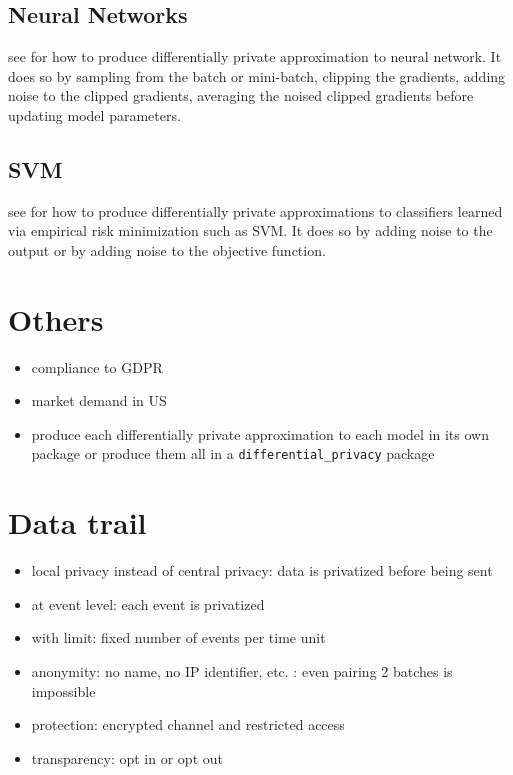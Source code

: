 \documentclass[12pt]{amsart}
\theoremstyle{definition}
\begin{document}
\subsection{Neural Networks} see \cite{neural_network} for how to produce differentially private approximation to neural network. It does so by sampling from the batch or mini-batch, clipping the gradients, adding noise to the clipped gradients, averaging the noised clipped gradients before updating model parameters.

\subsection{SVM} see \cite{svm} for how to produce differentially private approximations to classifiers learned via empirical risk minimization such as SVM. It does so by adding noise to the output or by adding noise to the objective function.


\section{Others}
\begin{itemize}
\item compliance to GDPR
\item market demand in US
\item produce each differentially private approximation to each model in its own package or produce them all in a \verb|differential_privacy| package
\end{itemize}

\section{Data trail}
\begin{itemize}
\item local privacy instead of central privacy: data is privatized before being sent
\item at event level: each event is privatized
\item with limit: fixed number of events per time unit
\item anonymity: no name, no IP identifier, etc. : even pairing 2 batches is impossible
\item protection: encrypted channel and restricted access 
\item transparency: opt in or opt out
\end{itemize}

\newpage
\begin{bibdiv}
\begin{biblist}
\end{biblist}
\end{bibdiv}
\end{document}
